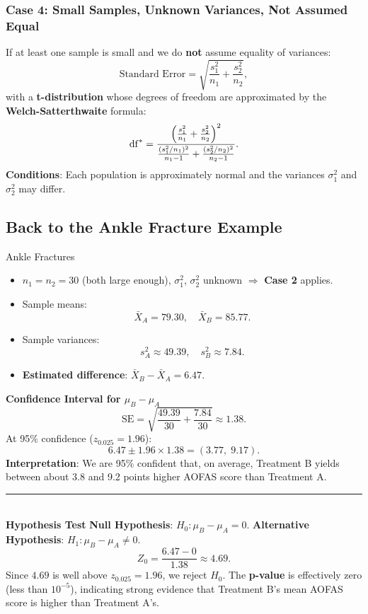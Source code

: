 \documentclass[10pt]{extarticle}
\begin{document}
\subsubsection{Case 4: Small Samples, Unknown Variances, Not Assumed Equal}
If at least one sample is small and we do \textbf{not} assume equality of variances:
$$
\text{Standard Error} = \sqrt{\frac{s_1^2}{n_1} + \frac{s_2^2}{n_2}},
$$
with a \textbf{t-distribution} whose degrees of freedom are approximated by the \textbf{Welch-Satterthwaite} formula:
$$
\mathrm{df}^* = \frac{\Bigl(\frac{s_1^2}{n_1} + \frac{s_2^2}{n_2}\Bigr)^2}{\frac{(s_1^2/n_1)^2}{n_1 - 1} + \frac{(s_2^2/n_2)^2}{n_2 - 1}}.
$$
\textbf{Conditions}: Each population is approximately normal and the variances $\sigma_1^2$ and $\sigma_2^2$ may differ.


\subsection{Back to the Ankle Fracture Example}
\begin{examplebox}{Ankle Fractures}{}
    \begin{itemize}
        \item $n_1 = n_2 = 30$ (both large enough), $\sigma_1^2$, $\sigma_2^2$ unknown $\Rightarrow$ \textbf{Case 2} applies.
        \item Sample means:
        $$
        \bar{X}_A = 79.30,\quad \bar{X}_B = 85.77.
        $$
        \item Sample variances:
        $$
        s_A^2 \approx 49.39,\quad s_B^2 \approx 7.84.
        $$
        \item \textbf{Estimated difference}: $\bar{X}_B - \bar{X}_A = 6.47$.
    \end{itemize}
    \textbf{Confidence Interval for $\mu_B - \mu_A$}
    $$
    \text{SE} = \sqrt{\frac{49.39}{30} + \frac{7.84}{30}} \approx 1.38.
    $$
    At 95\% confidence ($z_{0.025}=1.96$):
    $$
    6.47 \pm 1.96 \times 1.38 = (3.77,\; 9.17).
    $$
\textbf{Interpretation}: We are 95\% confident that, on average, Treatment B yields between about 3.8 and 9.2 points higher AOFAS score than Treatment A.

\noindent\rule{\textwidth}{1pt} \\ [2ex]
\textbf{Hypothesis Test}
\textbf{Null Hypothesis}: $H_0 : \mu_B - \mu_A = 0$.  
\textbf{Alternative Hypothesis}: $H_1 : \mu_B - \mu_A \neq 0$.
$$
Z_0 = \frac{6.47 - 0}{1.38} \approx 4.69.
$$
Since $4.69$ is well above $z_{0.025}=1.96$, we reject $H_0$. The \textbf{p-value} is effectively zero (less than $10^{-5}$), indicating strong evidence that Treatment B's mean AOFAS score is higher than Treatment A's.
\end{examplebox}
\end{document}

